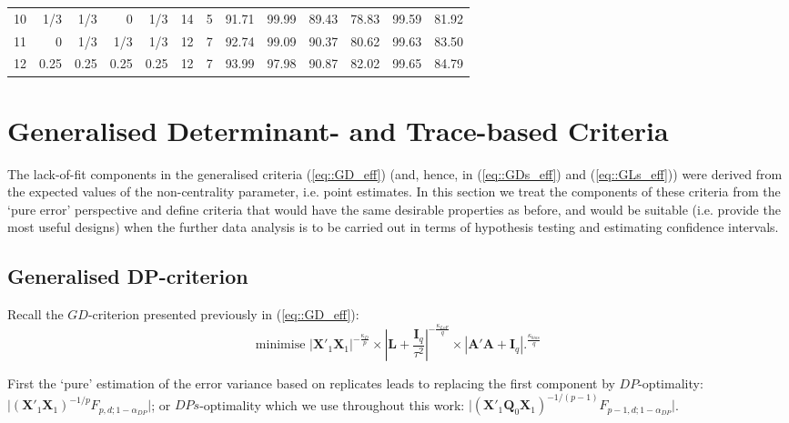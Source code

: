 \begin{table}[h]
\begin{center}
{\begin{tabular}{rrrrrrrrrrrrr}
10 & 1/3  & 1/3  & 0    & 1/3  & \multicolumn{1}{|r}{14} & 5  & \multicolumn{1}{|r}{91.71}  & 99.99  & \multicolumn{1}{|r}{89.43} & 78.83 & \multicolumn{1}{|r}{99.59} & 81.92 \\
11 & 0    & 1/3  & 1/3  & 1/3  & \multicolumn{1}{|r}{12} & 7  & \multicolumn{1}{|r}{92.74}  & 99.09  & \multicolumn{1}{|r}{90.37} & 80.62 & \multicolumn{1}{|r}{99.63} & 83.50 \\
12 & 0.25 & 0.25 & 0.25 & 0.25 & \multicolumn{1}{|r}{12} & 7  & \multicolumn{1}{|r}{93.99}  & 97.98  & \multicolumn{1}{|r}{90.87} & 82.02 & \multicolumn{1}{|r}{99.65} & 84.79 
\end{tabular}
}
\end{center}
\end{table} 

\section{Generalised Determinant- and Trace-based Criteria}
The lack-of-fit components in the generalised criteria (\ref{eq::GD_eff}) (and, hence, in (\ref{eq::GDs_eff}) and (\ref{eq::GLs_eff})) were derived from the expected values of the non-centrality parameter, i.e. point estimates. In this section we treat the components of these criteria from the `pure error' perspective and define criteria that would have the same desirable properties as before, and would be suitable (i.e. provide the most useful designs) when the further data analysis is to be carried out in terms of hypothesis testing and estimating confidence intervals.

\subsection{Generalised DP-criterion}
Recall the $GD$-criterion presented previously in (\ref{eq::GD_eff}):
\begin{equation*}
\mbox{minimise }|\bm{X}'_{1}\bm{X}_1|^{-\frac{\kappa_{D}}{p}}\times \left|\bm{L}+\frac{\bm{I}_{q}}{\tau^{2}}\right|^{-\frac{\kappa_{LoF}}{q}} \times |\bm{A}'\bm{A}+\bm{I}_{q}|.^{\frac{\kappa_{bias}}{q}}
\end{equation*}

First the `pure' estimation of the error variance based on replicates leads to replacing the first component by $DP$-optimality: $\vert(\bm{X}'_{1}\bm{X}_{1})^{-1/p}F_{p,d;1-\alpha_{DP}}\vert$; or $DPs$-optimality which we use throughout this work: $\vert(\bm{X}'_{1}\bm{Q}_{0}\bm{X}_{1})^{-1/(p-1)}F_{p-1,d;1-\alpha_{DP}}\vert$.


